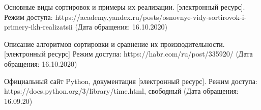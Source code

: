 \documentclass[12pt]{report}
\begin{document}
\begin{thebibliography}{2}
	 Основные виды сортировок и примеры их реализации. [электронный ресурс]. Режим доступа: https://academy.yandex.ru/posts/osnovnye-vidy-sortirovok-i-primery-ikh-realizatsii
	(Дата обращения: 16.10.2020)
	
	 Описание алгоритмов сортировки и сравнение их производительности. [электронный ресурс] Режим доступа:
	https://habr.com/ru/post/335920/
	(Дата обращения: 16.10.2020)
	
	 Официальный сайт Python, документация [электронный ресурс]. Режим доступа: https://docs.python.org/3/library/time.html, свободный (Дата обращения: 16.09.20)
	
\end{thebibliography}
\end{document}
